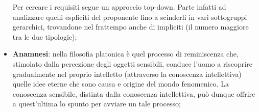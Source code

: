 \begin{itemize}
	Per cercare i requisiti segue un approccio top-down. Parte infatti ad analizzare quelli espliciti del proponente fino a scinderli in vari sottogruppi gerarchici, trovandone nel frattempo anche di impliciti (il numero maggiore tra le due tipologie);
	\item \textbf{Anamnesi}: nella filosofia platonica è quel processo di reminiscenza che, stimolato dalla percezione degli oggetti sensibili, conduce l'uomo a riscoprire gradualmente nel proprio intelletto (attraverso la conoscenza intellettiva) quelle idee eterne che sono causa e origine del mondo fenomenico. La conoscenza sensibile, distinta dalla conoscenza intellettiva, può dunque offrire a quest'ultima lo spunto per avviare un tale processo;


\end{itemize}
